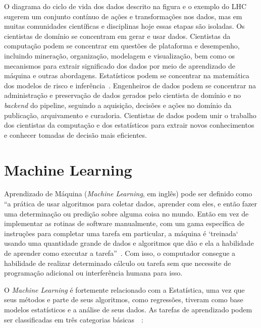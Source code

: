 \documentclass[portugues]{ic-tese}
\begin{document}
O diagrama do ciclo de vida dos dados descrito na figura e o exemplo do LHC sugerem um conjunto contínuo de ações e transformações nos dados, mas em muitas comunidades científicas e disciplinas hoje essas etapas são isoladas. Os cientistas de domínio se concentram em gerar e usar dados. Cientistas da computação podem se concentrar em questões de plataforma e desempenho, incluindo mineração, organização, modelagem e visualização, bem como os mecanismos para extrair significado dos dados por meio de aprendizado de máquina e outras abordagens. Estatísticos podem se concentrar na matemática dos modelos de risco e inferência~\citep{Berman_2018}. Engenheiros de dados podem se concentrar na administração e preservação de dados gerados pelo cientista de domínio e no \textit{backend} do pipeline, seguindo a aquisição, decisões e ações no domínio da publicação, arquivamento e curadoria. Cientistas de dados podem unir o trabalho dos cientistas da computação e dos estatísticos para extrair novos conhecimentos e conhecer tomadas de decisão mais eficientes.


\section{Machine Learning}
\label{sec:MachineLearning}

Aprendizado de Máquina (\textit{Machine Learning}, em inglês) pode ser definido como “a prática de usar algoritmos para coletar dados, aprender com eles, e então fazer uma determinação ou predição sobre alguma coisa no mundo. Então em vez de implementar as rotinas de software manualmente, com um gama específica de instruções para completar uma tarefa em particular, a máquina é `treinada` usando uma quantidade grande de dados e algoritmos que dão e ela a habilidade de aprender como executar a tarefa”~\citep{Copeland_2016}. Com isso, o computador consegue a habilidade de realizar determinado cálculo ou tarefa sem que necessite de programação adicional ou interferência humana para isso.

O \textit{Machine Learning} é fortemente relacionado com a Estatística, uma vez que seus métodos e parte de seus algoritmos, como regressões, tiveram como base modelos estatísticos e a análise de seus dados. As tarefas de aprendizado podem ser classificadas em três categorias básicas~\citep{MLWikipedia_2021}~\citep{MLSAS_2021}:
\end{document}
